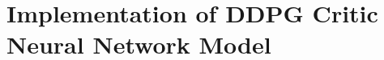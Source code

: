 \section{Implementation of DDPG Critic Neural Network Model}\label{app:implementation_critic_model}

